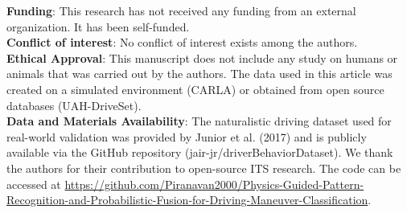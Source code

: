 \documentclass[pdflatex,sn-mathphys-num]{sn-jnl}
\theoremstyle{thmstyleone}
\theoremstyle{thmstyletwo}
\theoremstyle{thmstylethree}
\begin{document}
\textbf{Funding}: This research has not received any funding from an external organization. It has been self-funded. \\
\textbf{Conflict of interest}: No conflict of interest exists among the authors. \\
\textbf{Ethical Approval}: This manuscript does not include any study on humans or animals that was carried out by the authors. The data used in this article was created on a simulated environment (CARLA) or obtained from open source databases (UAH-DriveSet). \\
\textbf{Data and Materials Availability}: The naturalistic driving dataset used for real-world validation was provided by Junior et al. (2017) and is publicly available via the GitHub repository \cite{ferreira2017} (jair-jr/driverBehaviorDataset). We thank the authors for their contribution to open-source ITS research. The code can be accessed at \url{https://github.com/Piranavan2000/Physics-Guided-Pattern-Recognition-and-Probabilistic-Fusion-for-Driving-Maneuver-Classification}.
\end{document}
